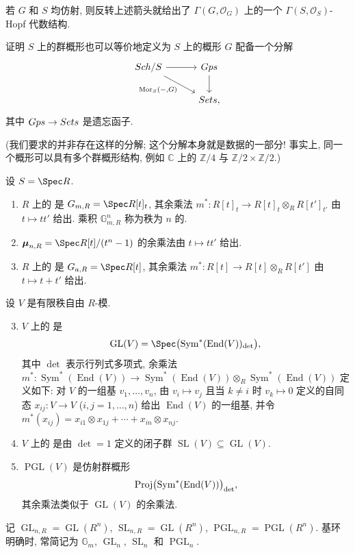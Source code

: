\begin{remark}\label{src:B.1.2}
若 $G$ 和 $S$ 均仿射, 则反转上述箭头就给出了 $\Gamma(G,\mathcal O_G)$ 上的一个 $\Gamma(S,\mathcal O_S)$-Hopf 代数结构.
\end{remark}
\begin{exercise}\label{src:B.1.3}
证明 $S$ 上的群概形也可以等价地定义为 $S$ 上的概形 $G$ 配备一个分解
\[
\begin{tikzcd}[column sep=3em]
\Sch/S\arrow[r]\arrow[dr,"{\operatorname{Mor}_S(-,G)}"']&\mathsf{Gps}\arrow[d]\\
&\Sets,
\end{tikzcd}
\]
其中 $Gps\to Sets$ 是遗忘函子.

(我们要求的并非存在这样的分解; 这个分解本身就是数据的一部分! 事实上, 同一个概形可以具有多个群概形结构, 例如 $\mathbb C$ 上的 $\mathbb Z/4$ 与 $\mathbb Z/2\times\mathbb Z/2$.)
\end{exercise}
\begin{example}[重要例子]\label{src:B.1.4}
设 $S=\Spec R$.
\begin{enumerate}[(1)]
\item $R$ 上的 是 $\mathbb G_{m,R}=\Spec R[t]_t$, 其余乘法 $m^*:R[t]_t\to R[t]_t\otimes_R R[t']_{t'}$ 由 $t\mapsto tt'$ 给出. 乘积 $\mathbb G_{m,R}^n$ 称为秩为 $n$ 的.
\item {} $\boldsymbol\mu_{n,R}=\Spec R[t]/(t^n-1)$ 的余乘法由 $t\mapsto tt'$ 给出.
\item $R$ 上的 是 $\mathbb G_{a,R}=\Spec R[t]$, 其余乘法 $m^*:R[t]\to R[t]\otimes_R R[t']$ 由 $t\mapsto t+t'$ 给出.
\end{enumerate}
设 $V$ 是有限秩自由 $R$-模.
\begin{enumerate}[(1)]\setcounter{enumi}{2}
\item $V$ 上的 是
\[
\operatorname{GL}(V)=\Spec\bigl(\operatorname{Sym}^*(\operatorname{End}(V))_{\det}\bigr),
\]
其中 $\det$ 表示行列式多项式, 余乘法 $m^*:\operatorname{Sym}^*(\operatorname{End}(V))\to\operatorname{Sym}^*(\operatorname{End}(V))\otimes_R\operatorname{Sym}^*(\operatorname{End}(V))$ 定义如下: 对 $V$ 的一组基 $v_1,\ldots,v_n$, 由 $v_i\mapsto v_j$ 且当 $k\ne i$ 时 $v_k\mapsto0$ 定义的自同态 $x_{ij}:V\to V$ ($i,j=1,\ldots,n$) 给出 $\operatorname{End}(V)$ 的一组基, 并令 $m^*(x_{ij})=x_{i1}\otimes x_{1j}+\cdots+x_{in}\otimes x_{nj}$.
\item $V$ 上的 是由 $\det=1$ 定义的闭子群 $\operatorname{SL}(V)\subseteq\operatorname{GL}(V)$.
\item {} $\operatorname{PGL}(V)$ 是仿射群概形
\[
\operatorname{Proj}\bigl(\operatorname{Sym}^*(\operatorname{End}(V))\bigr)_{\det},
\]
其余乘法类似于 $\operatorname{GL}(V)$ 的余乘法.
\end{enumerate}
记 $\operatorname{GL}_{n,R}=\operatorname{GL}(R^n)$, $\operatorname{SL}_{n,R}=\operatorname{GL}(R^n)$, $\operatorname{PGL}_{n,R}=\operatorname{PGL}(R^n)$. 基环明确时, 常简记为 $\mathbb G_m$, $\operatorname{GL}_n$, $\operatorname{SL}_n$ 和 $\operatorname{PGL}_n$.
\end{example}

